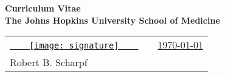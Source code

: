 \documentclass[11pt]{article}%
\newcommand{\largedot}{{\large $\cdot$}}
\newcommand{\contactfont}{\footnotesize}
\begin{document}
\thispagestyle{plain}
\fontsize{11}{13}  \selectfont

\begin{center}
\bf
Curriculum Vitae\\
The Johns Hopkins University School of Medicine
\end{center}

\begin{tabular}{lc r}
\underline{~~~~\texttt{[image: signature]}~~~~} \vspace{1em}&
\hspace{25em} & \underline{\today}\\[-1em]
Robert B. Scharpf & & \\
\end{tabular}\\

\end{document}
